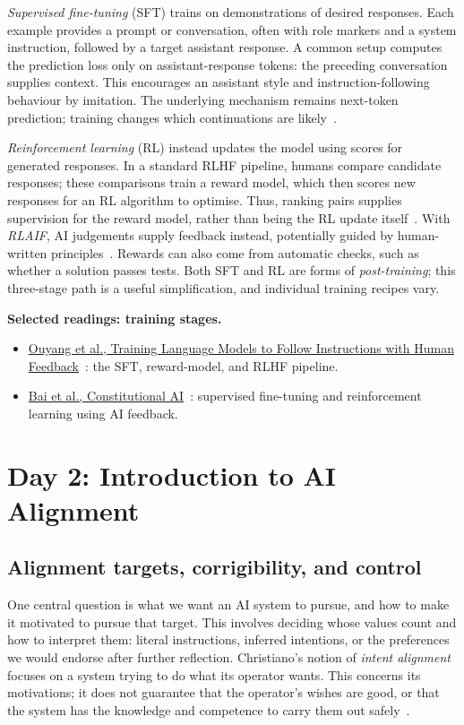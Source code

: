 \emph{Supervised fine-tuning} (SFT) trains on demonstrations of desired responses. Each example provides a prompt or conversation, often with role markers and a system instruction, followed by a target assistant response. A common setup computes the prediction loss only on assistant-response tokens: the preceding conversation supplies context. This encourages an assistant style and instruction-following behaviour by imitation. The underlying mechanism remains next-token prediction; training changes which continuations are likely~\cite{ouyang2022instructgpt}.

\emph{Reinforcement learning} (RL) instead updates the model using scores for generated responses. In a standard RLHF pipeline, humans compare candidate responses; these comparisons train a reward model, which then scores new responses for an RL algorithm to optimise. Thus, ranking pairs supplies supervision for the reward model, rather than being the RL update itself~\cite{ouyang2022instructgpt}. With \emph{RLAIF}, AI judgements supply feedback instead, potentially guided by human-written principles~\cite{bai2022constitutional}. Rewards can also come from automatic checks, such as whether a solution passes tests. Both SFT and RL are forms of \emph{post-training}; this three-stage path is a useful simplification, and individual training recipes vary.

\noindent\textbf{Selected readings: training stages.}
\begin{itemize}
  \item \href{https://arxiv.org/abs/2203.02155}{Ouyang et al., Training Language Models to Follow Instructions with Human Feedback}~\cite{ouyang2022instructgpt}: the SFT, reward-model, and RLHF pipeline.
  \item \href{https://arxiv.org/abs/2212.08073}{Bai et al., Constitutional AI}~\cite{bai2022constitutional}: supervised fine-tuning and reinforcement learning using AI feedback.
\end{itemize}

\section{Day 2: Introduction to AI Alignment}

\subsection{Alignment targets, corrigibility, and control}

One central question is what we want an AI system to pursue, and how to make it motivated to pursue that target. This involves deciding whose values count and how to interpret them: literal instructions, inferred intentions, or the preferences we would endorse after further reflection. Christiano's notion of \emph{intent alignment} focuses on a system trying to do what its operator wants. This concerns its motivations; it does not guarantee that the operator's wishes are good, or that the system has the knowledge and competence to carry them out safely~\cite{christiano2018clarifying}.

